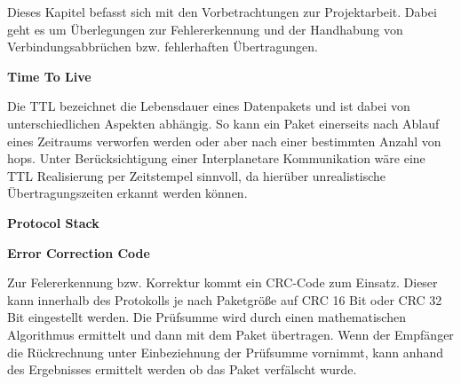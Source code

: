 

Dieses Kapitel befasst sich mit den Vorbetrachtungen zur Projektarbeit. Dabei
geht es um {\"U}berlegungen zur Fehlererkennung und der Handhabung von
Verbindungsabbr{\"u}chen bzw. fehlerhaften {\"U}bertragungen.

\textbf{Time To Live}

Die TTL bezeichnet die Lebensdauer eines Datenpakets und ist dabei von
unterschiedlichen Aspekten abh{\"a}ngig. So kann ein Paket einerseits nach
Ablauf eines Zeitraums verworfen werden oder aber nach einer bestimmten Anzahl
von hops. Unter Ber{\"u}cksichtigung einer Interplanetare Kommunikation w{\"a}re
eine TTL Realisierung per Zeitstempel sinnvoll, da hier{\"u}ber unrealistische
{\"U}bertragungszeiten erkannt werden k{\"o}nnen.

\textbf{Protocol Stack}


\textbf{Error Correction Code}

Zur Felererkennung bzw. Korrektur kommt ein CRC-Code zum Einsatz. Dieser kann
innerhalb des Protokolls je nach Paketgr{\"o}{\ss}e auf CRC 16 Bit oder CRC 32
Bit eingestellt werden. Die Pr{\"u}fsumme wird durch einen mathematischen
Algorithmus ermittelt und dann mit dem Paket {\"u}bertragen. Wenn der
Empf{\"a}nger die R{\"u}ckrechnung unter Einbeziehnung der Pr{\"u}fsumme
vornimmt, kann anhand des Ergebnisses ermittelt werden ob das Paket
verf{\"a}lscht wurde.
